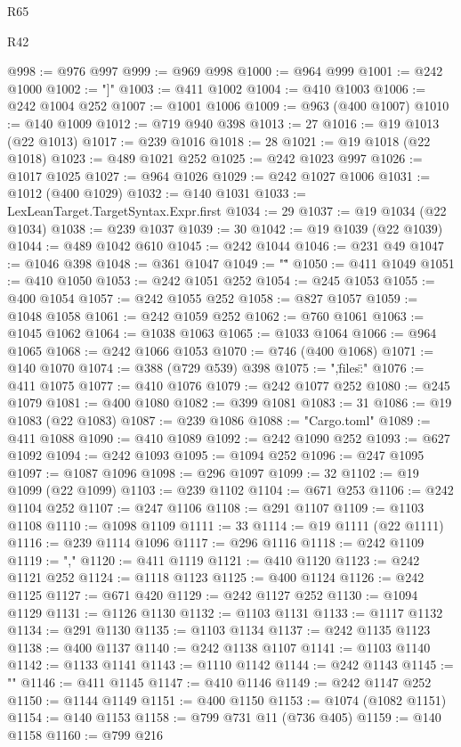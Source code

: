 \begin{lexlean}{R65}
\begin{lexlean}{R42}
\begin{coremodule}
{{{{{{{{{{{{{{{{{{{{{{{{{{{{{{{{{{{{{{{{{{{{{{{{{{{{{{{{{{{{{{{{{{{{{{{{{{{{{{{{{{{{{{{{{{{{{{{{{{{{{{{{{{{{{{{{{{{{{{{{{{{{{{{{{{{{{{{{{{{{{{{{{{{{{{{{{{{{{{{{{{{{{{{{{{{{{{{{{{{{{{{@998 := @976 @997
@999 := @969 @998
@1000 := @964 @999
@1001 := @242 @1000
@1002 := "]"
@1003 := @411 @1002
@1004 := @410 @1003
@1006 := @242 @1004 @252
@1007 := @1001 @1006
@1009 := @963 (@400 @1007)
@1010 := @140 @1009
@1012 := @719 @940 @398
@1013 := 27
@1016 := @19 @1013 (@22 @1013)
@1017 := @239 @1016
@1018 := 28
@1021 := @19 @1018 (@22 @1018)
@1023 := @489 @1021 @252
@1025 := @242 @1023 @997
@1026 := @1017 @1025
@1027 := @964 @1026
@1029 := @242 @1027 @1006
@1031 := @1012 (@400 @1029)
@1032 := @140 @1031
@1033 := LexLeanTarget.TargetSyntax.Expr.first
@1034 := 29
@1037 := @19 @1034 (@22 @1034)
@1038 := @239 @1037
@1039 := 30
@1042 := @19 @1039 (@22 @1039)
@1044 := @489 @1042 @610
@1045 := @242 @1044
@1046 := @231 @49
@1047 := @1046 @398
@1048 := @361 @1047
@1049 := "\""
@1050 := @411 @1049
@1051 := @410 @1050
@1053 := @242 @1051 @252
@1054 := @245 @1053
@1055 := @400 @1054
@1057 := @242 @1055 @252
@1058 := @827 @1057
@1059 := @1048 @1058
@1061 := @242 @1059 @252
@1062 := @760 @1061
@1063 := @1045 @1062
@1064 := @1038 @1063
@1065 := @1033 @1064
@1066 := @964 @1065
@1068 := @242 @1066 @1053
@1070 := @746 (@400 @1068)
@1071 := @140 @1070
@1074 := @388 (@729 @539) @398
@1075 := ",\"files\":{"
@1076 := @411 @1075
@1077 := @410 @1076
@1079 := @242 @1077 @252
@1080 := @245 @1079
@1081 := @400 @1080
@1082 := @399 @1081
@1083 := 31
@1086 := @19 @1083 (@22 @1083)
@1087 := @239 @1086
@1088 := "Cargo.toml"
@1089 := @411 @1088
@1090 := @410 @1089
@1092 := @242 @1090 @252
@1093 := @627 @1092
@1094 := @242 @1093
@1095 := @1094 @252
@1096 := @247 @1095
@1097 := @1087 @1096
@1098 := @296 @1097
@1099 := 32
@1102 := @19 @1099 (@22 @1099)
@1103 := @239 @1102
@1104 := @671 @253
@1106 := @242 @1104 @252
@1107 := @247 @1106
@1108 := @291 @1107
@1109 := @1103 @1108
@1110 := @1098 @1109
@1111 := 33
@1114 := @19 @1111 (@22 @1111)
@1116 := @239 @1114 @1096
@1117 := @296 @1116
@1118 := @242 @1109
@1119 := ","
@1120 := @411 @1119
@1121 := @410 @1120
@1123 := @242 @1121 @252
@1124 := @1118 @1123
@1125 := @400 @1124
@1126 := @242 @1125
@1127 := @671 @420
@1129 := @242 @1127 @252
@1130 := @1094 @1129
@1131 := @1126 @1130
@1132 := @1103 @1131
@1133 := @1117 @1132
@1134 := @291 @1130
@1135 := @1103 @1134
@1137 := @242 @1135 @1123
@1138 := @400 @1137
@1140 := @242 @1138 @1107
@1141 := @1103 @1140
@1142 := @1133 @1141
@1143 := @1110 @1142
@1144 := @242 @1143
@1145 := "}"
@1146 := @411 @1145
@1147 := @410 @1146
@1149 := @242 @1147 @252
@1150 := @1144 @1149
@1151 := @400 @1150
@1153 := @1074 (@1082 @1151)
@1154 := @140 @1153
@1158 := @799 @731 @11 (@736 @405)
@1159 := @140 @1158
@1160 := @799 @216
}}}}}}}}}}}}}}}}}}}}}}}}}}}}}}}}}}}}}}}}}}}}}}}}}}}}}}}}}}}}}}}}}}}}}}}}}}}}}}}}}}}}}}}}}}}}}}}}}}}}}}}}}}}}}}}}}}}}}}}}}}}}}}}}}}}}}}}}}}}}}}}}}}}}}}}}}}}}}}}}}}}}}}}}}}}}}}}}}}}}}}}
\end{coremodule}
\end{lexlean}
\end{lexlean}
